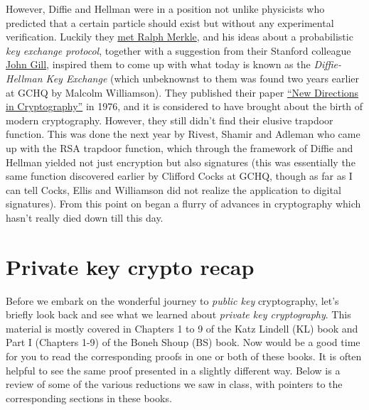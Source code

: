 However, Diffie and Hellman were in a position not unlike physicists who
predicted that a certain particle should exist but without any
experimental verification. Luckily they
\href{http://cr.yp.to/bib/1988/diffie.pdf}{met Ralph Merkle}, and his
ideas about a probabilistic \emph{key exchange protocol}, together with
a suggestion from their Stanford colleague
\href{https://profiles.stanford.edu/john-gill}{John Gill}, inspired them
to come up with what today is known as the \emph{Diffie-Hellman Key
Exchange} (which unbeknownst to them was found two years earlier at GCHQ
by Malcolm Williamson). They published their paper
\href{https://www-ee.stanford.edu/~hellman/publications/24.pdf}{``New
Directions in Cryptography''} in 1976, and it is considered to have
brought about the birth of modern cryptography. However, they still
didn't find their elusive trapdoor function. This was done the next year
by Rivest, Shamir and Adleman who came up with the RSA trapdoor
function, which through the framework of Diffie and Hellman yielded not
just encryption but also signatures (this was essentially the same
function discovered earlier by Clifford Cocks at GCHQ, though as far as
I can tell Cocks, Ellis and Williamson did not realize the application
to digital signatures). From this point on began a flurry of advances in
cryptography which hasn't really died down till this day.

\section{Private key crypto recap}\label{Private-key-crypto-recap}

Before we embark on the wonderful journey to \emph{public key}
cryptography, let's briefly look back and see what we learned about
\emph{private key cryptography}. This material is mostly covered in
Chapters 1 to 9 of the Katz Lindell (KL) book and Part I (Chapters 1-9)
of the Boneh Shoup (BS) book. Now would be a good time for you to read
the corresponding proofs in one or both of these books. It is often
helpful to see the same proof presented in a slightly different way.
Below is a review of some of the various reductions we saw in class,
with pointers to the corresponding sections in these books.

